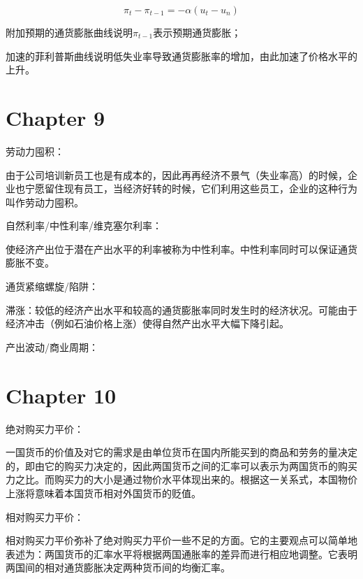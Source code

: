 \documentclass{article}
\begin{document}
\[
\pi_t-\pi_{t-1}=-\alpha(u_t-u_n)
\]

附加预期的通货膨胀曲线说明$ \pi_{t-1} $表示预期通货膨胀；

加速的菲利普斯曲线说明低失业率导致通货膨胀率的增加，由此加速了价格水平的上升。

\section{Chapter 9}

劳动力囤积：

由于公司培训新员工也是有成本的，因此再再经济不景气（失业率高）的时候，企业也宁愿留住现有员工，当经济好转的时候，它们利用这些员工，企业的这种行为叫作劳动力囤积。

\hspace*{\fill}

自然利率/中性利率/维克塞尔利率：

使经济产出位于潜在产出水平的利率被称为中性利率。中性利率同时可以保证通货膨胀不变。

\hspace*{\fill}

通货紧缩螺旋/陷阱：

\hspace*{\fill}

滞涨：较低的经济产出水平和较高的通货膨胀率同时发生时的经济状况。可能由于经济冲击（例如石油价格上涨）使得自然产出水平大幅下降引起。

\hspace*{\fill}

产出波动/商业周期：

\section{Chapter 10}

绝对购买力平价：

一国货币的价值及对它的需求是由单位货币在国内所能买到的商品和劳务的量决定的，即由它的购买力决定的，因此两国货币之间的汇率可以表示为两国货币的购买力之比。而购买力的大小是通过物价水平体现出来的。根据这一关系式，本国物价上涨将意味着本国货币相对外国货币的贬值。

相对购买力平价：

相对购买力平价弥补了绝对购买力平价一些不足的方面。它的主要观点可以简单地表述为：两国货币的汇率水平将根据两国通胀率的差异而进行相应地调整。它表明两国间的相对通货膨胀决定两种货币间的均衡汇率。

\hspace*{\fill}
\end{document}
